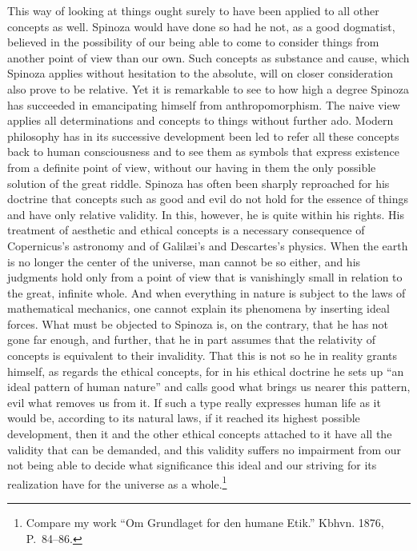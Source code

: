 \documentclass[12pt]{book}
\newcommand{\opage}[1]{\marginnote{\footnotesize\textit{[#1]}}}
\begin{document}
This way of looking at things ought surely to have been applied to all other concepts
as well. Spinoza would have done so had he not, as a good dogmatist, believed in the
possibility of our being able to come to consider things from another point of view than
our own. Such concepts as substance and cause, which Spinoza applies without hesitation
to the absolute, will on closer consideration also prove to be relative. Yet it is
remarkable to see to how high a degree Spinoza has succeeded in emancipating himself from
anthropomorphism. The naive view applies all determinations and concepts to things
without further ado. Modern philosophy has in its successive development been led to
refer all these concepts back to human consciousness and to see them as symbols that
express existence from a definite point of view, without our having in them the only
possible solution of the great riddle. Spinoza has often been sharply reproached for his
doctrine that concepts such as good and evil do not hold for the essence of things and
have only relative validity. In this, however, he is quite within his rights. His
treatment of aesthetic and ethical concepts is a necessary \opage{119}consequence of
Copernicus's astronomy and of Galilæi's and Descartes's physics. When the earth is no
longer the center of the universe, man cannot be so either, and his judgments hold only
from a point of view that is vanishingly small in relation to the great, infinite whole.
And when everything in nature is subject to the laws of mathematical mechanics, one
cannot explain its phenomena by inserting ideal forces. What must be objected to Spinoza
is, on the contrary, that he has not gone far enough, and further, that he in part
assumes that the relativity of concepts is equivalent to their invalidity. That this is
not so he in reality grants himself, as regards the ethical concepts, for in his ethical
doctrine he sets up ``an ideal pattern of human nature'' and calls good what brings us
nearer this pattern, evil what removes us from it. If such a type really expresses
human life as it would be, according to its natural laws, if it reached its highest
possible development, then it and the other ethical concepts attached to it have all the
validity that can be demanded, and this validity suffers no impairment from our not
being able to decide what significance this ideal and our striving for its realization
have for the universe as a whole.\footnote{Compare my work ``Om Grundlaget for den humane
Etik.'' Kbhvn. 1876, P.~84--86.}
\end{document}
